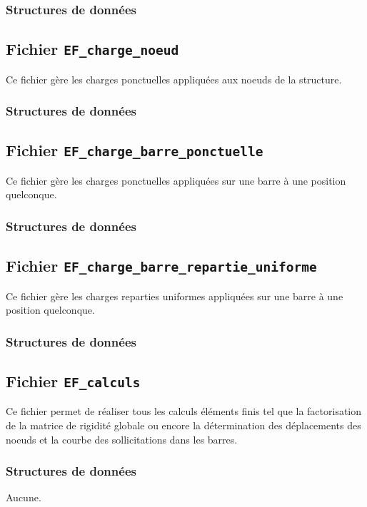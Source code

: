 \documentclass{article}
\begin{document}
\subsubsection{Structures de données}


\subsection{Fichier {\texttt{EF\_charge\_noeud}}}
Ce fichier gère les charges ponctuelles appliquées aux noeuds de la structure.
\subsubsection{Structures de données}


\subsection{Fichier {\texttt{EF\_charge\_barre\_ponctuelle}}}
Ce fichier gère les charges ponctuelles appliquées sur une barre à une position quelconque.
\subsubsection{Structures de données}


\subsection{Fichier {\texttt{EF\_charge\_barre\_repartie\_uniforme}}}
Ce fichier gère les charges reparties uniformes appliquées sur une barre à une position quelconque.
\subsubsection{Structures de données}


\subsection{Fichier {\texttt{EF\_calculs}}}
Ce fichier permet de réaliser tous les calculs éléments finis tel que la factorisation de la matrice de rigidité globale ou encore la détermination des déplacements des noeuds et la courbe des sollicitations dans les barres.
\subsubsection{Structures de données}
Aucune.

\end{document}
